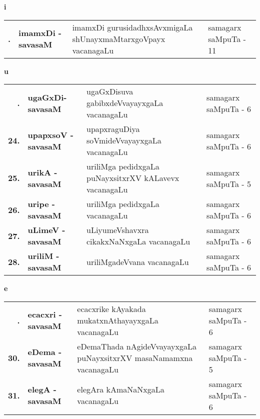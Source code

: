 \centerline{\bf i}

{\renewcommand{\arraystretch}{1.35}
\begin{longtable}{>{\bf}r>{\bf}l>{\raggedright}p{8cm}l}
\endfirsthead
\endhead
\endfoot
\endlastfoot
22. & imamxDi - savasaM & imamxDi gurusidadhxsAvxmigaLa shUnayxmaMtarxgoVpayx vacanagaLu & samagarx saMpuTa - 11\\
\end{longtable}}


\bigskip

\centerline{\bf u}

\medskip

{\renewcommand{\arraystretch}{1.35}
\begin{longtable}{>{\bf}r>{\bf}l>{\raggedright}p{8cm}l}
\endfirsthead
\endhead
\endfoot
\endlastfoot
23. &  ugaGxDi- savasaM & ugaGxDisuva gabibxdeVvayayxgaLa vacanagaLu & samagarx saMpuTa - 6\\
24. &  upapxsoV - savasaM & upapxraguDiya soVmideVvayayxgaLa vacanagaLu & samagarx saMpuTa - 6 \\
25. &  urikA - savasaM & uriliMga pedidxgaLa puNayxsitxrXV kALavevx vacanagaLu & samagarx saMpuTa - 5\\
26. &  uripe - savasaM & uriliMga pedidxgaLa vacanagaLu & samagarx saMpuTa - 6\\
27. &  uLimeV - savasaM & uLiyumeVshavxra cikakxNaNxgaLa vacanagaLu & samagarx saMpuTa - 6\\
28. &  uriliM - savasaM & uriliMgadeVvana vacanagaLu & samagarx saMpuTa - 6\\
\end{longtable}}
\bigskip

\centerline{\bf e}

\medskip
{\renewcommand{\arraystretch}{1.35}
\begin{longtable}{>{\bf}r>{\bf}l>{\raggedright}p{8.2cm}l}
\endfirsthead
\endhead
\endfoot
\endlastfoot
29. &  ecacxri - savasaM &  ecacxrike kAyakada mukatxnAthayayxgaLa vacanagaLu & samagarx saMpuTa - 6\\
30. &  eDema - savasaM &  eDemaThada nAgideVvayayxgaLa puNayxsitxrXV masaNamamxna vacanagaLu & samagarx saMpuTa - 5\\
31. &  elegA - savasaM &  elegAra kAmaNaNxgaLa vacanagaLu & samagarx saMpuTa - 6\\
\end{longtable}}
\bigskip

